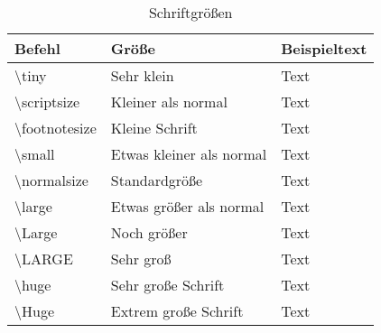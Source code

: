 \begin{table}[H]
    \centering
    \begin{tabular}{lll}
        \toprule
        \textbf{Befehl}             & \textbf{Größe}           & \textbf{Beispieltext} \\
        \midrule
        \textbackslash tiny         & Sehr klein               & {\tiny Text}          \\
        \textbackslash scriptsize   & Kleiner als normal       & {\scriptsize Text}    \\
        \textbackslash footnotesize & Kleine Schrift           & {\footnotesize Text}  \\
        \textbackslash small        & Etwas kleiner als normal & {\small Text}         \\
        \textbackslash normalsize   & Standardgröße            & {\normalsize Text}    \\
        \textbackslash large        & Etwas größer als normal  & {\large Text}         \\
        \textbackslash Large        & Noch größer              & {\Large Text}         \\
        \textbackslash LARGE        & Sehr groß                & {\LARGE Text}         \\
        \textbackslash huge         & Sehr große Schrift       & {\huge Text}          \\
        \textbackslash Huge         & Extrem große Schrift     & {\Huge Text}          \\
        \bottomrule
    \end{tabular}
    \caption{Schriftgrößen}
    \label{tab:schriftgroessen}
\end{table}